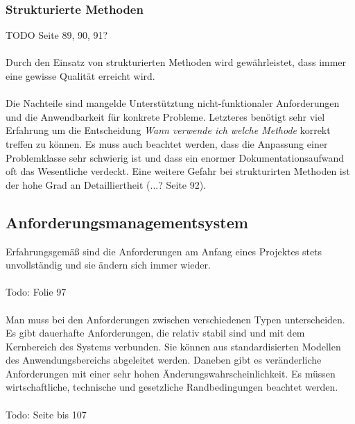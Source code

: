 \subsubsection{Strukturierte Methoden}
TODO Seite 89, 90, 91?
\\\\
Durch den Einsatz von strukturierten Methoden wird gewährleistet, dass immer eine gewisse Qualität erreicht wird. 
\\\\
Die Nachteile sind mangelde Unterstütztung nicht-funktionaler Anforderungen und die Anwendbarkeit für konkrete Probleme. Letzteres benötigt sehr viel Erfahrung um die Entscheidung \textit{Wann verwende ich welche Methode} korrekt treffen zu können. Es muss auch beachtet werden, dass die Anpassung einer Problemklasse sehr schwierig ist und dass ein enormer Dokumentationsaufwand oft das Wesentliche verdeckt. Eine weitere Gefahr bei strukturirten Methoden ist der hohe Grad an Detailliertheit (...? Seite 92).

\subsection{Anforderungsmanagementsystem}
Erfahrungsgemäß sind die Anforderungen am Anfang eines Projektes stets unvollständig und sie ändern sich immer wieder. 
\\\\
Todo: Folie 97
\\\\
Man muss bei den Anforderungen zwischen verschiedenen Typen unterscheiden. Es gibt dauerhafte Anforderungen, die relativ stabil sind und mit dem Kernbereich des Systems verbunden. Sie können aus standardisierten Modellen des Anwendungsbereichs abgeleitet werden. Daneben gibt es veränderliche Anforderungen mit einer sehr hohen Änderungswahrscheinlichkeit. Es müssen wirtschaftliche, technische und gesetzliche Randbedingungen beachtet werden. 
\\\\
Todo: Seite bis 107